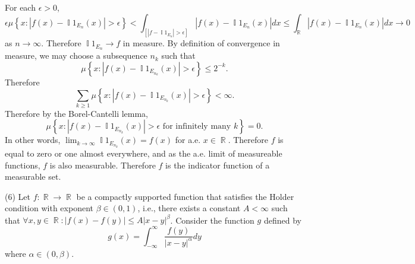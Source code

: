 \documentclass[answers]{exam}
\DeclareMathOperator{\RR}{\mathbb{R}}
\DeclareMathOperator{\II}{\mathbb{I}}
\begin{document}
\begin{questions}
\begin{solution}
For each $\epsilon>0$, 
\begin{equation*}
  \epsilon \mu \left\{ x: |f(x)-\II{1}_{E_{n}}(x)| >\epsilon \right\}
  <  \int_{\left[|f-\II{1}_{E_{n}}| >\epsilon \right]} |f(x)-\II{1}_{E_{n}}(x)|dx
  \leq \int_{\RR} |f(x)-\II{1}_{E_{n}}(x)|dx \to 0
\end{equation*}
as $n\to \infty$.
Therefore $\II{1}_{E_{n}}\to f$ in measure. By definition of convergence in measure, we may choose a subsequence $n_{k}$ such that
\begin{equation*}
  \mu \left\{ x: |f(x)-\II{1}_{E_{n_{k}}}(x)|>\epsilon \right\} \leq 2^{-k}.
\end{equation*}
Therefore
\begin{equation*}
  \sum_{k\geq 1}\mu \left\{ x: |f(x)-\II{1}_{E_{n_{k}}}(x)|>\epsilon \right\}<\infty.
\end{equation*}
Therefore by the Borel-Cantelli lemma,
\begin{equation*}
  \mu \left\{ x: |f(x)-\II{1}_{E_{n_{k}}}(x)|>\epsilon \text{ for infinitely many }k \right\}=0.
\end{equation*}
In other words, $\lim_{k\to \infty} \II{1}_{E_{n_{k}}}(x) = f(x)$ for a.e. $x\in \RR$. Therefore $f$ is equal to zero or one almost everywhere, and as the a.e. limit of measureable functions, $f$ is also measurable. Therefore $f$ is the indicator function of a measurable set.

\end{solution}




\question (6) Let $f: \RR \to\RR$ be a compactly supported function that satisfies the Holder condition with exponent $\beta\in (0,1)$, i.e., there exists a constant $A<\infty$ such that $\forall x,y\in \RR: |f(x)-f(y)|\leq A|x-y|^{\beta}$. Consider the function $g$ defined by
\begin{equation*}
g(x) = \int_{-\infty}^{\infty} \frac{f(y)}{|x-y|^{\alpha}} dy
\end{equation*}
where $\alpha \in (0,\beta).$
\begin{parts}

\end{parts}
\end{questions}
\end{document}
